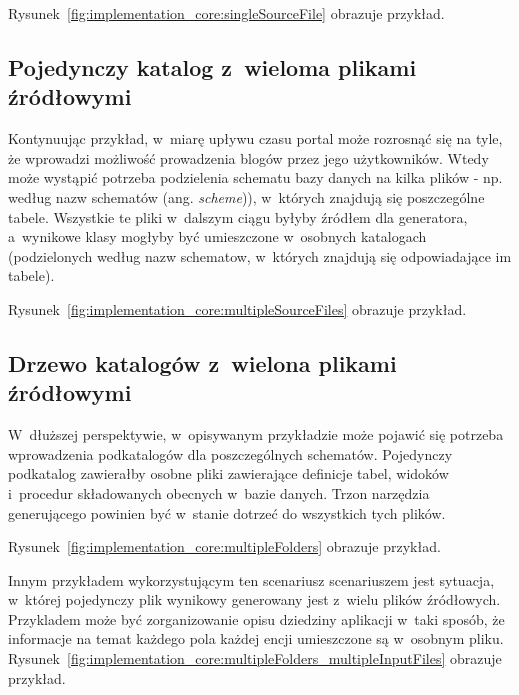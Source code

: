 Rysunek~\ref{fig:implementation_core:singleSourceFile} obrazuje przykład.




\subsection{Pojedynczy katalog z~wieloma plikami źródłowymi}

Kontynuując przykład, w~miarę upływu czasu portal może rozrosnąć się na tyle, że wprowadzi możliwość prowadzenia blogów przez jego użytkowników.
Wtedy może wystąpić potrzeba podzielenia schematu bazy danych na kilka plików - np. według nazw schematów (ang. \emph{scheme})), w~których znajdują się poszczególne tabele.
Wszystkie te pliki w~dalszym ciągu byłyby źródłem dla generatora, a~wynikowe klasy mogłyby być umieszczone w~osobnych katalogach (podzielonych według nazw schematow, w~których znajdują się odpowiadające im tabele).

Rysunek~\ref{fig:implementation_core:multipleSourceFiles} obrazuje przykład.




\subsection{Drzewo katalogów z~wielona plikami źródłowymi} \label{sec:core:files_structure:many_folders}

W~dłuższej perspektywie, w~opisywanym przykładzie może pojawić się potrzeba wprowadzenia podkatalogów dla poszczególnych schematów.
Pojedynczy podkatalog zawierałby osobne pliki zawierające definicje tabel, widoków i~procedur składowanych obecnych w~bazie danych.
Trzon narzędzia generującego powinien być w~stanie dotrzeć do wszystkich tych plików.

Rysunek~\ref{fig:implementation_core:multipleFolders} obrazuje przykład.



Innym przykładem wykorzystującym ten scenariusz scenariuszem jest sytuacja, w~której pojedynczy plik wynikowy generowany jest z~wielu plików źródłowych.
Przykladem może być zorganizowanie opisu dziedziny aplikacji w~taki sposób, że informacje na temat każdego pola każdej encji umieszczone są w~osobnym pliku.
Rysunek~\ref{fig:implementation_core:multipleFolders_multipleInputFiles} obrazuje przykład.

